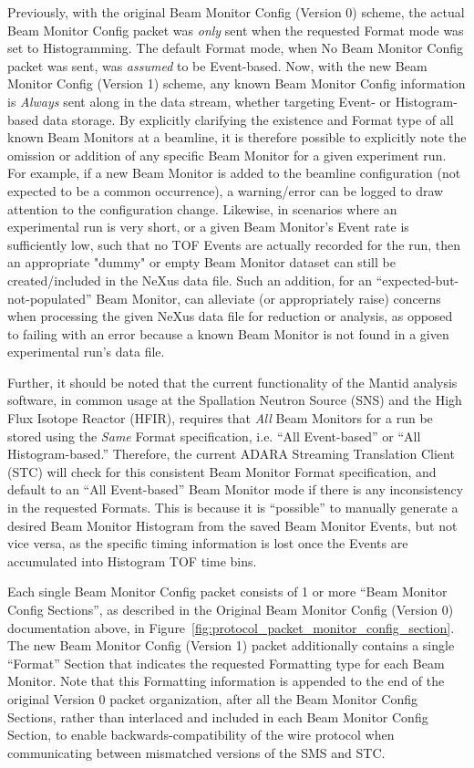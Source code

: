 Previously, with the original Beam Monitor Config (Version 0) scheme,
the actual Beam Monitor Config packet was {\it only} sent
when the requested Format mode was set to Histogramming.
The default Format mode, when No Beam Monitor Config packet was sent,
was {\it assumed} to be Event-based.
Now, with the new Beam Monitor Config (Version 1) scheme,
any known Beam Monitor Config information is {\it Always} sent
along in the data stream,
whether targeting Event- or Histogram-based data storage.
By explicitly clarifying the existence and Format type
of all known Beam Monitors at a beamline,
it is therefore possible to explicitly note the omission or addition
of any specific Beam Monitor for a given experiment run.
For example, if a new Beam Monitor is added to the beamline configuration
(not expected to be a common occurrence),
a warning/error can be logged to draw attention
to the configuration change.
Likewise, in scenarios where an experimental run is very short,
or a given Beam Monitor's Event rate is sufficiently low,
such that no TOF Events are actually recorded for the run,
then an appropriate "dummy" or empty Beam Monitor dataset
can still be created/included in the NeXus data file.
Such an addition, for an ``expected-but-not-populated'' Beam Monitor,
can alleviate (or appropriately raise) concerns when processing
the given NeXus data file for reduction or analysis,
as opposed to failing with an error because a known Beam Monitor
is not found in a given experimental run's data file.

Further, it should be noted that the current functionality of the
Mantid analysis software,
in common usage at the Spallation Neutron Source (SNS)
and the High Flux Isotope Reactor (HFIR),
requires that {\it All} Beam Monitors for a run
be stored using the {\it Same} Format specification,
i.e. ``All Event-based'' or ``All Histogram-based.''
Therefore, the current ADARA Streaming Translation Client (STC)
will check for this consistent Beam Monitor Format specification,
and default to an ``All Event-based'' Beam Monitor mode
if there is any inconsistency in the requested Formats.
This is because it is ``possible'' to manually generate a desired
Beam Monitor Histogram from the saved Beam Monitor Events,
but not vice versa,
as the specific timing information is lost once the Events are
accumulated into Histogram TOF time bins.

Each single Beam Monitor Config packet consists of 1 or more
``Beam Monitor Config Sections'', as described in
the Original Beam Monitor Config (Version 0) documentation above,
in Figure~\ref{fig:protocol_packet_monitor_config_section}.
The new Beam Monitor Config (Version 1) packet
additionally contains a single ``Format'' Section
that indicates the requested Formatting type for each Beam Monitor.
Note that this Formatting information is appended to the end
of the original Version 0 packet organization,
after all the Beam Monitor Config Sections,
rather than interlaced and included in each Beam Monitor Config Section,
to enable backwards-compatibility of the wire protocol
when communicating between mismatched versions of the SMS and STC.

